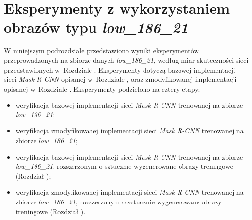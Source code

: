 \section{Eksperymenty z wykorzystaniem obrazów typu \textit{low\_186\_21}}
\label{sec:experymenty_low}
W niniejszym podrozdziale przedstawiono wyniki eksperymentów przeprowadzonych na zbiorze danych \textit{low\_186\_21}, według miar skuteczności sieci przedstawionych w~Rozdziale .
Eksperymenty dotyczą bazowej implementacji sieci \textit{Mask R-CNN} \cite{matterport-mask-rcnn} opisanej w~Rozdziale , oraz zmodyfikowanej implementacji opisanej w~Rozdziale .
Eksperymenty podzielono na cztery etapy:

\begin{itemize}
 \item weryfikacja bazowej implementacji sieci \textit{Mask R-CNN} trenowanej na zbiorze \textit{low\_186\_21};
 \item weryfikacja zmodyfikowanej implementacji sieci \textit{Mask R-CNN} trenowanej na zbiorze \textit{low\_186\_21};
 \item weryfikacja bazowej implementacji sieci \textit{Mask R-CNN} trenowanej na zbiorze \textit{low\_186\_21}, rozszerzonym o sztucznie wygenerowane obrazy treningowe (Rozdział );
 \item weryfikacja zmodyfikowanej implementacji sieci \textit{Mask R-CNN} trenowanej na zbiorze \textit{low\_186\_21}, rozszerzonym o sztucznie wygenerowane obrazy treningowe (Rozdział ).
\end{itemize}
